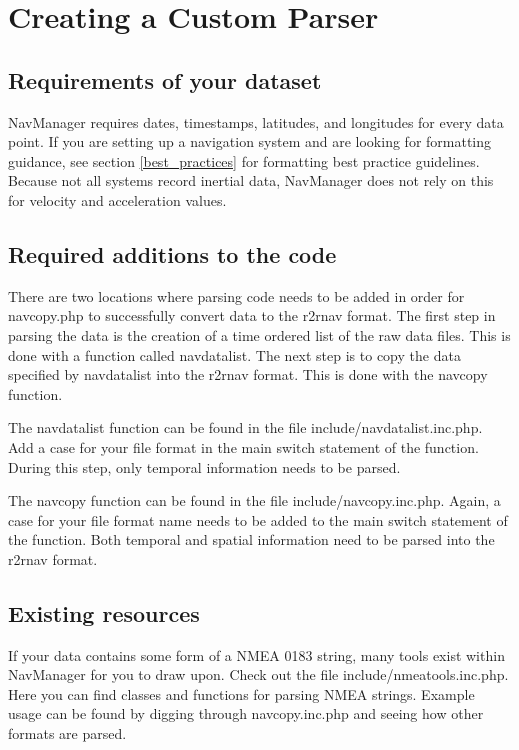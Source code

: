 \documentclass{article}
\begin{document}
	\newpage	
	\section{Creating a Custom Parser}
	\label{custom_parser}
		\subsection{Requirements of your dataset}
		
NavManager requires dates, timestamps, latitudes, and longitudes for every data point.  If you are setting up a navigation system and are looking for formatting guidance, see section \ref{best_practices} for formatting best practice guidelines.  Because not all systems record inertial data, NavManager does not rely on this for velocity and acceleration values.
		
		\subsection{Required additions to the code}
		
There are two locations where parsing code needs to be added in order for navcopy.php to successfully convert data to the r2rnav format.  The first step in parsing the data is the creation of a time ordered list of the raw data files.  This is done with a function called navdatalist.  The next step is to copy the data specified by navdatalist into the r2rnav format.  This is done with the navcopy function.

The navdatalist function can be found in the file include/navdatalist.inc.php.  Add a case for your file format in the main switch statement of the function.  During this step, only temporal information needs to be parsed.

The navcopy function can be found in the file include/navcopy.inc.php.  Again, a case for your file format name needs to be added to the main switch statement of the function.  Both temporal and spatial information need to be parsed into the r2rnav format.

		\subsection{Existing resources}
		
If your data contains some form of a NMEA 0183 string, many tools exist within NavManager for you to draw upon.  Check out the file include/nmeatools.inc.php.  Here you can find classes and functions for parsing NMEA strings.  Example usage can be found by digging through navcopy.inc.php and seeing how other formats are parsed.
	
\end{document}
